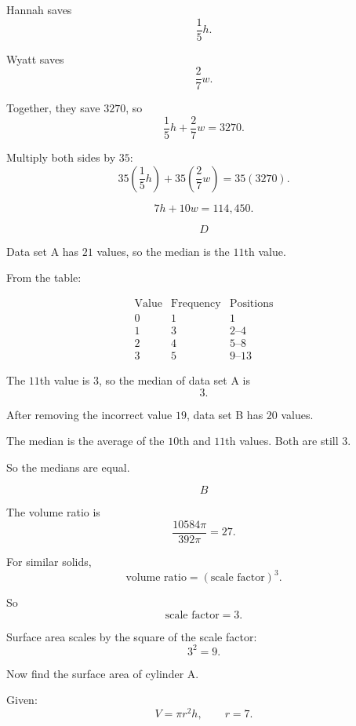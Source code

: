 \documentclass[11pt]{article}
\newcommand{\circnum}[1]{%
\tikz[baseline=(char.base)]{
\node[
circle,
draw=nppurpledark,
fill=nplight,
inner sep=1.4pt,
line width=0.8pt,
text=nppurpledark
] (char) {\small\textbf{#1}};
}}
\begin{document}
\bigskip

\textbf{\circnum{3}}

Hannah saves
\[
\frac15h.
\]

Wyatt saves
\[
\frac27w.
\]

Together, they save \(3270\), so
\[
\frac15h+\frac27w=3270.
\]

Multiply both sides by \(35\):
\[
35\left(\frac15h\right)+35\left(\frac27w\right)=35(3270).
\]

\[
7h+10w=114{,}450.
\]

\[
\boxed{D}
\]

\bigskip

\textbf{\circnum{4}}

Data set A has \(21\) values, so the median is the \(11\)th value.

From the table:

\[
\begin{array}{c|c|c}
\text{Value} & \text{Frequency} & \text{Positions}\\
\hline
0 & 1 & 1\\
1 & 3 & 2\text{--}4\\
2 & 4 & 5\text{--}8\\
3 & 5 & 9\text{--}13
\end{array}
\]

The \(11\)th value is \(3\), so the median of data set A is
\[
3.
\]

After removing the incorrect value \(19\), data set B has \(20\) values.

The median is the average of the \(10\)th and \(11\)th values. Both are still \(3\).

So the medians are equal.

\[
\boxed{B}
\]

\bigskip

\textbf{\circnum{5}}

The volume ratio is
\[
\frac{10584\pi}{392\pi}=27.
\]

For similar solids,
\[
\text{volume ratio}=(\text{scale factor})^3.
\]

So
\[
\text{scale factor}=3.
\]

Surface area scales by the square of the scale factor:
\[
3^2=9.
\]

Now find the surface area of cylinder A.

Given:
\[
V=\pi r^2h,\qquad r=7.
\]
\end{document}

